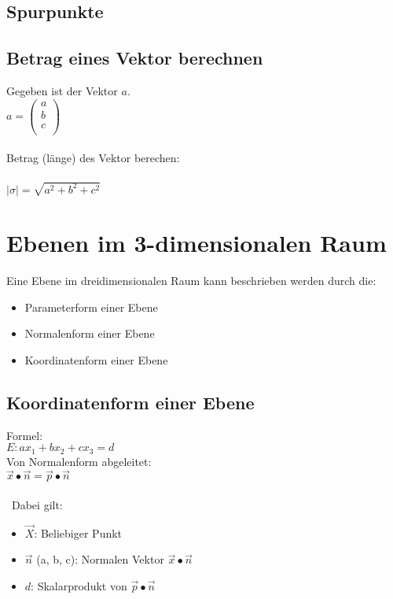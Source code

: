 \subsection{Spurpunkte}

\subsection{Betrag eines Vektor berechnen}
Gegeben ist der Vektor $a$. \\
$
a = 
\begin{pmatrix}
    a \\ b \\ c \\
\end{pmatrix}
$ 
\\\\
Betrag (länge) des Vektor berechen: \\\\
$
|\sigma| = \sqrt{a^2 + b^2 + c^2}
$

\section{Ebenen im 3-dimensionalen Raum}
Eine Ebene im dreidimensionalen Raum kann beschrieben werden durch die:
\begin{itemize}
    \item Parameterform einer Ebene
    \item Normalenform einer Ebene
    \item Koordinatenform einer Ebene
\end{itemize}

\subsection{Koordinatenform einer Ebene}
Formel: \\
$
E: ax_1 + bx_2 + cx_3 = d
$
\\
Von Normalenform abgeleitet: \\
$\vec{x} \bullet \vec{n} = \vec{p} \bullet \vec{n}$ \\\\
\
Dabei gilt:
\begin{itemize}
    \item $\vec{X}$: Beliebiger Punkt
    \item $\vec{n}$ (a, b, c): Normalen Vektor $\vec{x} \bullet \vec{n}$
    \item $d$: Skalarprodukt von $\vec{p} \bullet \vec{n}$
\end{itemize}
